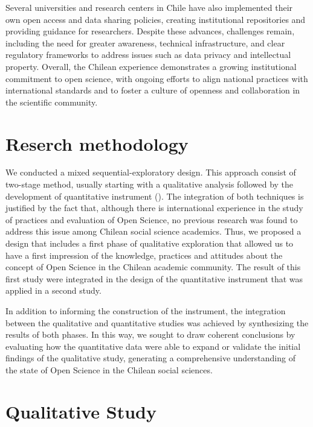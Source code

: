 \documentclass[
  english,
  letterpaper,
]{article}
\begin{document}
Several universities and research centers in Chile have also implemented
their own open access and data sharing policies, creating institutional
repositories and providing guidance for researchers. Despite these
advances, challenges remain, including the need for greater awareness,
technical infrastructure, and clear regulatory frameworks to address
issues such as data privacy and intellectual property. Overall, the
Chilean experience demonstrates a growing institutional commitment to
open science, with ongoing efforts to align national practices with
international standards and to foster a culture of openness and
collaboration in the scientific community.

\section{Reserch methodology}\label{reserch-methodology}

We conducted a mixed sequential-exploratory design. This approach
consist of two-stage method, usually starting with a qualitative
analysis followed by the development of quantitative instrument
().
The integration of both techniques is justified by the fact that,
although there is international experience in the study of practices and
evaluation of Open Science, no previous research was found to address
this issue among Chilean social science academics. Thus, we proposed a
design that includes a first phase of qualitative exploration that
allowed us to have a first impression of the knowledge, practices and
attitudes about the concept of Open Science in the Chilean academic
community. The result of this first study were integrated in the design
of the quantitative instrument that was applied in a second study.

In addition to informing the construction of the instrument, the
integration between the qualitative and quantitative studies was
achieved by synthesizing the results of both phases. In this way, we
sought to draw coherent conclusions by evaluating how the quantitative
data were able to expand or validate the initial findings of the
qualitative study, generating a comprehensive understanding of the state
of Open Science in the Chilean social sciences.

\section{Qualitative Study}\label{qualitative-study}
\end{document}
